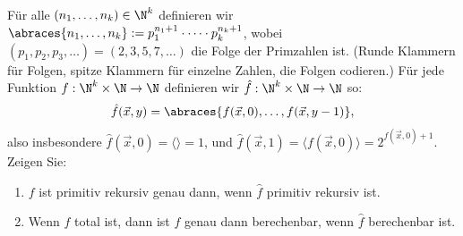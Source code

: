 
\begin{exercise}[216]

\phantom{}
	Für alle $(n_1, \dots, n_k) \in \N^k$  definieren wir $\abraces{n_1, \dots, n_k} := p_1^{n_1 + 1} \cdot \cdots \cdot p_k^{n_k + 1}$, wobei $(p_1, p_2, p_3, \dots) = (2,3,5,7,\dots)$ die Folge der Primzahlen ist. (Runde Klammern für Folgen, spitze Klammern für einzelne Zahlen, die Folgen codieren.)
	\newline
	\newline
	Für jede Funktion $f:\N^k \times \N \to \N$ definieren wir $\hat{f}:\N^k \times \N \to \N$ so:
	\begin{align*}
	\hat{f}(\vec{x}, y) = \abraces{f(\vec{x}, 0), \dots, f(\vec{x}, y - 1)},
	\end{align*}
	also insbesondere $\hat{f}(\vec{x}, 0) = \langle \rangle = 1$, und $\hat{f}(\vec{x}, 1) = \langle f(\vec{x}, 0) \rangle = 2^{f(\vec{x}, 0) + 1}$.
	\newline
	\newline
	Zeigen Sie:
	\begin{enumerate}[label = (\alph*)]
		\item $f$ ist primitiv rekursiv genau dann, wenn $\hat{f}$ primitiv rekursiv ist.
		\item Wenn $f$ total ist, dann ist $f$ genau dann berechenbar, wenn $\hat{f}$ berechenbar ist.
	\end{enumerate}
\end{exercise}


